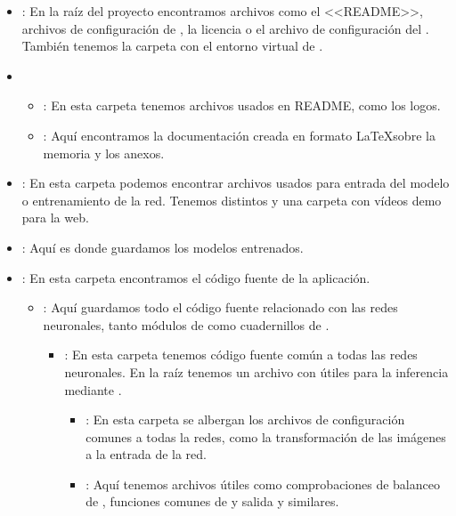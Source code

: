 \begin{itemize}

  \item \prog{/}: En la raíz del proyecto encontramos archivos como el <<README>>, archivos de configuración de , la licencia o el archivo de configuración del . También tenemos la carpeta con el entorno virtual de .

  \item {}
        \begin{itemize}
          \item {}: En esta carpeta tenemos archivos usados en README, como los logos.
          \item {}: Aquí encontramos la documentación creada en formato \LaTeX sobre la memoria y los anexos.
        \end{itemize}

  \item {}: En esta carpeta podemos encontrar archivos usados para entrada del modelo o entrenamiento de la red. Tenemos distintos  y una carpeta con vídeos demo para la web.

  \item {}: Aquí es donde guardamos los modelos entrenados.

  \item {}: En esta carpeta encontramos el código fuente de la aplicación.
        \begin{itemize}
          \item {}: Aquí guardamos todo el código fuente relacionado con las redes neuronales, tanto módulos de  como cuadernillos de .
                \begin{itemize}
                  \item {}: En esta carpeta tenemos código fuente común a todas las redes neuronales. En la raíz tenemos un archivo con útiles para la inferencia mediante .
                        \begin{itemize}
                          \item {}: En esta carpeta se albergan los archivos de configuración comunes a todas la redes, como la transformación de las imágenes a la entrada de la red.
                          \item {}: Aquí tenemos archivos útiles como comprobaciones de balanceo de , funciones comunes de  y salida y similares.
                        \end{itemize}


\end{itemize}
\end{itemize}
\end{itemize}
